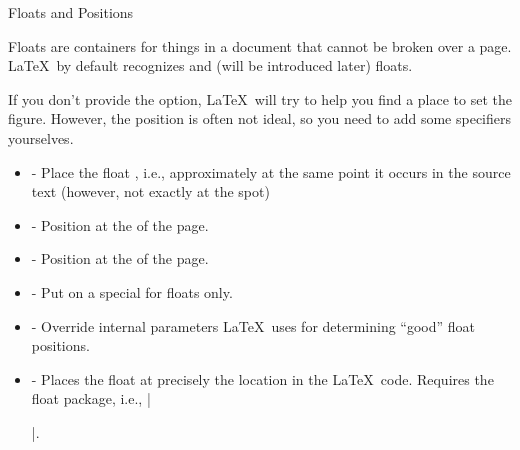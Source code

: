 
\begin{frame}[fragile]{Floats and Positions}

Floats are containers for things in a document that cannot be broken over a page. \LaTeX\ by default recognizes  and  (will be introduced later) floats. \medskip

If you don't provide the  option, \LaTeX\ will try to help you find a place to set the figure. However, the position is often not ideal, so you need to add some specifiers yourselves. 

\begin{itemize}
\item {} - Place the float , i.e., approximately at the same point it occurs in the source text (however, not exactly at the spot)
\item {} - Position at the  of the page.
\item {} - Position at the  of the page.
\item {} - Put on a special  for floats only.
\item \packagename{!} - Override internal parameters \LaTeX\ uses for determining ``good'' float positions.
\item {} -  Places the float at precisely the location in the \LaTeX\ code. Requires the float package, i.e., \LC|\usepackage{float}|.
\end{itemize}

\end{frame}



